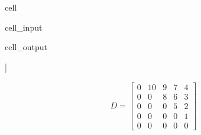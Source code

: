 \documentclass[letterpaper,10pt,english]{jupyterBook}
\begin{document}
\begin{sphinxuseclass}{cell}\begin{sphinxVerbatimInput}

\begin{sphinxuseclass}{cell_input}
\begin{sphinxVerbatim}[commandchars=\\\{\}]
   
\end{sphinxVerbatim}

\end{sphinxuseclass}\end{sphinxVerbatimInput}
\begin{sphinxVerbatimOutput}

\begin{sphinxuseclass}{cell_output}
\begin{sphinxVerbatim}[commandchars=\\\{\}]
[[0 0 0 0 0]
 [0 0 0 0 0]
 [0 0 0 0 0]
 [0 0 0 0 0]
 [0 0 0 0 0]]
\end{sphinxVerbatim}

\end{sphinxuseclass}\end{sphinxVerbatimOutput}

\end{sphinxuseclass}\begin{equation*}
\begin{split}
D=\begin{bmatrix}
  0 &  10 &  9 &  7 &  4\\
  0 &  0 &  8 &  6 &  3\\
  0 &  0 &  0 &  5 &  2\\
  0 &  0 &  0 &  0 &  1\\
  0 &  0 &  0 &  0 &  0
\end{bmatrix}
\end{split}
\end{equation*}
\end{document}
